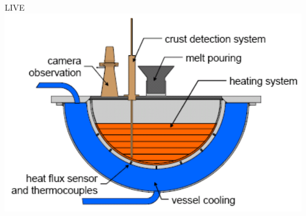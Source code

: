 \begin{frame}[fragile]
\begin{itemize}
\begin{columns}[T]
\begin{column}{0.28\textwidth}
{\tiny LIVE} \\ \includegraphics[width=1.0\textwidth]{Figures/live_1.png}
    \end{column}
\end{columns}
\end{itemize}
\end{frame}
